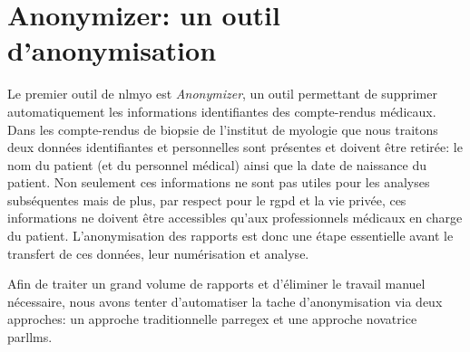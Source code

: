 \section{Anonymizer: un outil d'anonymisation}
Le premier outil de \gls{nlmyo} est \textit{Anonymizer}, un outil permettant de supprimer automatiquement les informations identifiantes des compte-rendus médicaux. Dans les compte-rendus de biopsie de l'institut de myologie que nous traitons deux données identifiantes et personnelles sont présentes et doivent être retirée: le nom du patient (et du personnel médical) ainsi que la date de naissance du patient. Non seulement ces informations ne sont pas utiles pour les analyses subséquentes mais de plus, par respect pour le \gls{rgpd} et la vie privée, ces informations ne doivent être accessibles qu'aux professionnels médicaux en charge du patient. L'anonymisation des rapports est donc une étape essentielle avant le transfert de ces données, leur numérisation et analyse.

Afin de traiter un grand volume de rapports et d'éliminer le travail manuel nécessaire, nous avons tenter d'automatiser la tache d'anonymisation via deux approches: un approche traditionnelle par\gls{regex} et une approche novatrice par\gls{llms}.
